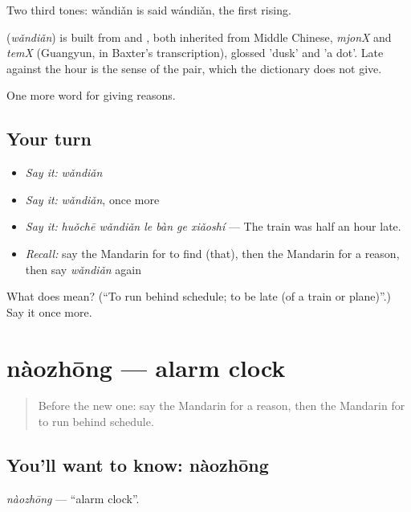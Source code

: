 Two third tones: wǎndiǎn is said wándiǎn, the first rising.

\begin{cousinweb}
\textbf{} (\emph{wǎndiǎn}) is built from  and , both inherited from Middle Chinese, \emph{mjonX} and \emph{temX} (Guangyun, in Baxter's transcription), glossed 'dusk' and 'a dot'. Late against the hour is the sense of the pair, which the dictionary does not give.
\end{cousinweb}

\begin{grammarlens}[title={What you've built}]
One more word for giving reasons.
\end{grammarlens}

\subsection*{Your turn}
\begin{itemize}
\raggedright
  \item \emph{Say it:} \emph{wǎndiǎn}
  \item \emph{Say it:} \emph{wǎndiǎn}, once more
  \item \emph{Say it:} \emph{huǒchē wǎndiǎn le bàn ge xiǎoshí} — The train was half an hour late.
  \item \emph{Recall:} say the Mandarin for to find (that), then the Mandarin for a reason, then say \emph{wǎndiǎn} again
\end{itemize}

\begin{tcolorbox}[breakable,colback=teal!4,colframe=teal!35!black,title={Before you move on}]
What does  mean? (\textquotedblleft{}To run behind schedule; to be late (of a train or plane)\textquotedblright{}.) Say it once more.
\end{tcolorbox}
\section[nàozhōng]{nàozhōng — alarm clock}

\label{lesson:ZH-C145-naozhong}



\begin{quote}
Before the new one: say the Mandarin for a reason, then the Mandarin for to run behind schedule.
\end{quote}

\subsection*{You'll want to know: nàozhōng}
\emph{nàozhōng} — \textquotedblleft{}alarm clock\textquotedblright{}.

